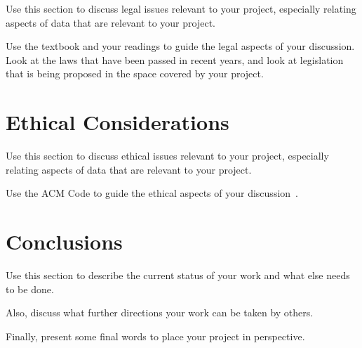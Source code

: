 \documentclass[sigconf, anonymous]{acmart}
\begin{document}
Use this section to discuss legal issues relevant to your project,
especially relating aspects of data that are relevant to your project.

Use the textbook and your readings to guide the legal aspects of your
discussion. Look at the laws that have been passed in recent years,
and look at legislation that is being proposed in the space covered by
your project.

\section{Ethical Considerations}
\label{ethical considerations}

Use this section to discuss ethical issues relevant to your
project, especially relating aspects of data that are relevant to your
project.

Use the ACM Code to guide the ethical aspects of your
discussion~\cite{ACMCODE}.


\section{Conclusions}
\label{conclusions}

Use this section to describe the current status of your work
and what else needs to be done.

Also, discuss what further directions your work can be taken by
others.

Finally, present some final words to place your project in
perspective.

\balance
\end{document}
